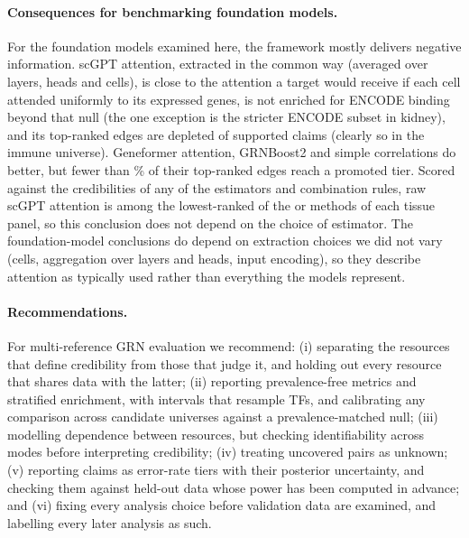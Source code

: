 \paragraph{Consequences for benchmarking foundation models.}
For the foundation models examined here, the framework mostly delivers negative information.
scGPT attention, extracted in the common way (averaged over layers, heads and cells), is close to the attention a target would receive if each cell attended uniformly to its expressed genes, is not enriched for ENCODE binding beyond that null (the one exception is the stricter ENCODE subset in kidney), and its top-ranked edges are depleted of supported claims (clearly so in the immune universe).
Geneformer attention, GRNBoost2 and simple correlations do better, but fewer than \nMethFracBoundCorr{}\% of their top-ranked edges reach a promoted tier.
Scored against the credibilities of any of the \nRobNEst{} estimators and combination rules, raw scGPT attention is among the \nScBottom{} lowest-ranked of the \nRobNMethodsKidLung{} or \nRobNMethodsImm{} methods of each tissue panel, so this conclusion does not depend on the choice of estimator.
The foundation-model conclusions do depend on extraction choices we did not vary (cells, aggregation over layers and heads, input encoding), so they describe attention as typically used rather than everything the models represent.

\paragraph{Recommendations.}
For multi-reference GRN evaluation we recommend:
(i) separating the resources that define credibility from those that judge it, and holding out every resource that shares data with the latter;
(ii) reporting prevalence-free metrics and stratified enrichment, with intervals that resample TFs, and calibrating any comparison across candidate universes against a prevalence-matched null;
(iii) modelling dependence between resources, but checking identifiability across modes before interpreting credibility;
(iv) treating uncovered pairs as unknown;
(v) reporting claims as error-rate tiers with their posterior uncertainty, and checking them against held-out data whose power has been computed in advance; and
(vi) fixing every analysis choice before validation data are examined, and labelling every later analysis as such.

